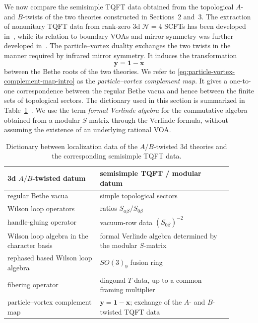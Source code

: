 \documentclass[11pt,a4paper]{article}
\numberwithin{equation}{section}
\begin{document}
We now compare the semisimple TQFT data obtained from the topological $A$- and $B$-twists of the two theories constructed in Sections~2 and~3.  The extraction of nonunitary TQFT data from rank-zero 3d $\mathcal N=4$ SCFTs has been developed in~\cite{Gang:2021hrd,Gang:2023rei,GangKimParkStubbs:2024Nahm}, while its relation to boundary VOAs and mirror symmetry was further developed in~\cite{CreutzigGarnerKim:2024mirror}.  The particle--vortex duality exchanges the two twists in the manner required by infrared mirror symmetry.  It induces the transformation
\begin{equation}
  \boldsymbol y=\boldsymbol 1-\boldsymbol x
  \label{eq:particle-vortex-complement-map-intro}
\end{equation}
between the Bethe roots of the two theories.  We refer to \eqref{eq:particle-vortex-complement-map-intro} as the \emph{particle--vortex complement map}.  It gives a one-to-one correspondence between the regular Bethe vacua and hence between the finite sets of topological sectors.  The dictionary used in this section is summarized in Table~\ref{tab:TQFT-dictionary}~\cite{NekrasovShatashvili:2015BetheGauge,Benini:2015noa,Okuda:2012nx,Okuda:2013fea,Closset:2016arn,Closset:2017zgf,ClossetKimWillett:2018Seifert}.  We use the term \emph{formal Verlinde algebra} for the commutative algebra obtained from a modular $S$-matrix through the Verlinde formula, without assuming the existence of an underlying rational VOA.

\begin{table}[htbp]
\centering
\small
\setlength{\tabcolsep}{6pt}
\renewcommand{\arraystretch}{1.08}
\caption{Dictionary between localization data of the $A/B$-twisted 3d theories and the corresponding semisimple TQFT data.}
\label{tab:TQFT-dictionary}
\begin{tabular}{p{0.37\linewidth}p{0.53\linewidth}}
\toprule
3d $A/B$-twisted datum & semisimple TQFT / modular datum \\
\midrule
regular Bethe vacua & simple topological sectors \\
Wilson loop operators & ratios $S_{\alpha\beta}/S_{0\beta}$ \\
handle-gluing operator & vacuum-row data $(S_{0\beta})^{-2}$ \\
Wilson loop algebra in the character basis & formal Verlinde algebra determined by the modular $S$-matrix \\
rephased based Wilson loop algebra & $SO(3)_9$ fusion ring \\
fibering operator & diagonal $T$ data, up to a common framing multiplier \\
particle--vortex complement map & $\boldsymbol y=\boldsymbol 1-\boldsymbol x$; exchange of the $A$- and $B$-twisted TQFT data \\
\bottomrule
\end{tabular}
\end{table}
\end{document}
